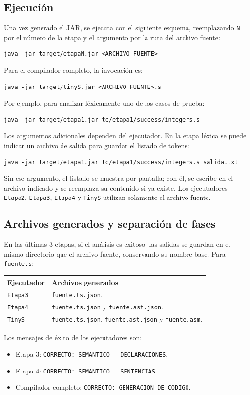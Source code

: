 \subsection{Ejecución}
Una vez generado el JAR, se ejecuta con el siguiente esquema, reemplazando
\texttt{N} por el número de la etapa y el argumento por la ruta del archivo
fuente:
\begin{verbatim}
java -jar target/etapaN.jar <ARCHIVO_FUENTE>
\end{verbatim}
Para el compilador completo, la invocación es:
\begin{verbatim}
java -jar target/tinyS.jar <ARCHIVO_FUENTE>.s
\end{verbatim}
Por ejemplo, para analizar léxicamente uno de los casos de prueba:
\begin{verbatim}
java -jar target/etapa1.jar tc/etapa1/success/integers.s
\end{verbatim}
Los argumentos adicionales dependen del ejecutador. En la etapa léxica se
puede indicar un archivo de salida para guardar el listado de tokens:
\begin{verbatim}
java -jar target/etapa1.jar tc/etapa1/success/integers.s salida.txt
\end{verbatim}
Sin ese argumento, el listado se muestra por pantalla; con él, se escribe
en el archivo indicado y se reemplaza su contenido si ya existe.
Los ejecutadores \texttt{Etapa2}, \texttt{Etapa3}, \texttt{Etapa4} y
\texttt{TinyS} utilizan solamente el archivo fuente.

\subsection{Archivos generados y separación de fases}
En las últimas 3 etapas, si el análisis es exitoso, las salidas se guardan en el mismo directorio
que el archivo fuente, conservando su nombre base. Para \texttt{fuente.s}:
\begin{center}
\begin{tabular}{lp{}}
\textbf{Ejecutador} & \textbf{Archivos generados} \\
\hline
\texttt{Etapa3} & \texttt{fuente.ts.json}. \\
\texttt{Etapa4} & \texttt{fuente.ts.json} y \texttt{fuente.ast.json}. \\
\texttt{TinyS} & \texttt{fuente.ts.json}, \texttt{fuente.ast.json} y \texttt{fuente.asm}. \\
\end{tabular}
\end{center}
Los mensajes de éxito de los ejecutadores son:
\begin{itemize}[leftmargin=*]
  \item Etapa 3: \texttt{CORRECTO: SEMANTICO - DECLARACIONES}.
  \item Etapa 4: \texttt{CORRECTO: SEMANTICO - SENTENCIAS}.
  \item Compilador completo: \texttt{CORRECTO: GENERACION DE CODIGO}.
\end{itemize}

